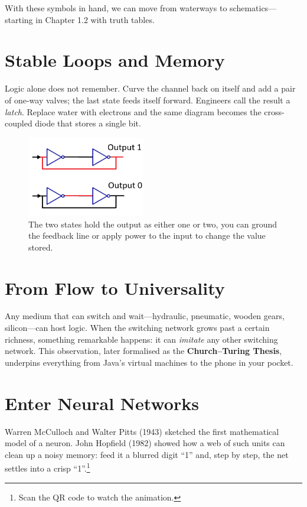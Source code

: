\documentclass{book}       %
\begin{document}
With these symbols in hand, we can move from waterways to schematics—starting in Chapter 1.2 with truth tables.  



\section*{Stable Loops and Memory}

Logic alone does not remember.  
Curve the channel back on itself and add a pair of one-way valves; the last state feeds itself forward.  
Engineers call the result a \emph{latch}.  
Replace water with electrons and the same diagram becomes the cross-coupled diode that stores a single bit.

\begin{figure}[h]
  \centering
  \includegraphics[height=3.5cm]{diode_memory.png}
  \caption{The two states hold the output as either one or two, you can ground the feedback line or apply power to the input to change the value stored.}
  \label{fig:diode-latch}
\end{figure}

\section*{From Flow to Universality}

Any medium that can switch and wait—hydraulic, pneumatic, wooden gears, silicon—can host logic.  
When the switching network grows past a certain richness, something remarkable happens:  
it can \emph{imitate} any other switching network.  
This observation, later formalised as the \textbf{Church–Turing Thesis}, underpins everything from Java’s virtual machines to the phone in your pocket.

\section*{Enter Neural Networks}

Warren McCulloch and Walter Pitts (1943) sketched the first mathematical model of a neuron.  
John Hopfield (1982) showed how a web of such units can clean up a noisy memory:  
feed it a blurred digit “1” and, step by step, the net settles into a crisp “1”.\footnote{Scan the QR code to watch the animation.}
\end{document}
